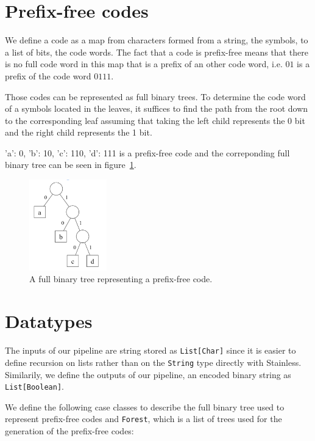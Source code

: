 \documentclass[a4paper,UKenglish,cleveref, autoref, thm-restate]{lipics-v2021}
\begin{document}
\section{Prefix-free codes}

We define a code as a map from characters formed from a string, the symbols, to a list of bits, the code words. The fact that a code is prefix-free means that there is no full code word in this map that is a prefix of an other code word, i.e. $01$ is a prefix of the code word $0111$.

Those codes can be represented as full binary trees. To determine the code word of a symbols located in the leaves, it suffices to find the path from the root down to the corresponding leaf assuming that taking the left child represents the 0 bit and the right child represents the 1 bit.

{'a': 0, 'b': 10, 'c': 110, 'd': 111} is a prefix-free code and the correponding full binary tree can be seen in figure~\ref{fig:pfc}.
\begin{figure}[ht]
    \centering
    \includegraphics[width=0.3\textwidth]{pfc.png}
    \caption{A full binary tree representing a prefix-free code.\label{fig:pfc}}
\end{figure}

\section{Datatypes}

The inputs of our pipeline are string stored as \lstinline{List[Char]} since it is easier to define recursion on lists rather than on the \lstinline{String} type directly with Stainless. 
Similarily, we define the outputs of our pipeline, an encoded binary string as \lstinline{List[Boolean]}.

We define the following case classes to describe the full binary tree used to represent prefix-free codes and \lstinline{Forest}, which is a list of trees used for the generation of the prefix-free codes:
\end{document}
